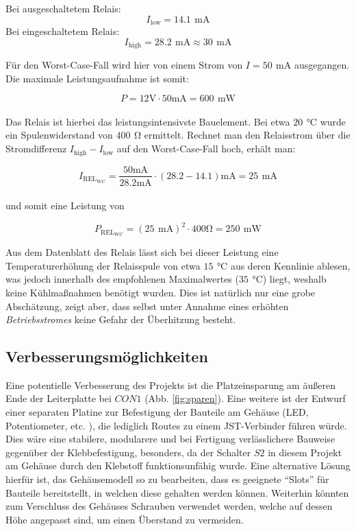 \documentclass[a4paper, 12pt]{article}
\begin{document}
      Bei ausgeschaltetem Relais: $$I_{\text{low}} = 14.1 \,\ \si{\milli\ampere}$$
      \indent Bei eingeschaltetem Relais: $$I_{\text{high}} = 28.2 \,\ \si{\milli\ampere} \approx 30 \,\ \si{\milli\ampere}$$


    Für den Worst-Case-Fall wird hier von einem Strom von $I = 50 \,\ \si{\milli\ampere}$ ausgegangen. Die maximale Leistungsaufnahme ist somit:

    $$P = 12 \si{\volt} \cdot 50 \si{\milli\ampere} = 600 \,\ \si{\milli\watt}$$\\

    Das Relais ist hierbei das leistungsintensivste Bauelement. Bei etwa $20 \,\ \si{\celsius}$ wurde ein Spulenwiderstand von $400 \,\ \si{\ohm}$ ermittelt. Rechnet man den Relaisstrom über die Stromdifferenz $I_{\text{high}}-I_{\text{low}}$ auf den Worst-Case-Fall hoch, erhält man:

    $$I_{\text{REL}_{\text{WC}}} = \frac{50\si{\milli\ampere}}{28.2\si{\milli\ampere}} \cdot (28.2 - 14.1)\si{\milli\ampere}= 25 \,\ \si{\milli\ampere}$$\\

    \noindent und somit eine Leistung von

    $$P_{\text{REL}_{\text{WC}}} = (25 \,\ \si{\milli\ampere})^2 \cdot 400 \si{\ohm} =  250 \,\ \si{\milli\watt}$$

    Aus dem Datenblatt des Relais lässt sich bei dieser Leistung eine Temperaturerhöhung der Relaisspule von etwa $15 \,\ \si{\celsius}$ aus deren Kennlinie ablesen, was jedoch innerhalb des empfohlenen Maximalwertes ($35 \,\ \si{\celsius}$) liegt, weshalb keine Kühlmaßnahmen benötigt wurden. Dies ist natürlich nur eine grobe Abschätzung, zeigt aber, dass selbst unter Annahme eines erhöhten \emph{Betriebsstromes} keine Gefahr der Überhitzung besteht.


  \subsection{Verbesserungsmöglichkeiten}
    Eine potentielle Verbesserung des Projekts ist die Platzeinsparung am äußeren Ende der Leiterplatte bei $CON1$ (Abb. \ref{fig:sparen}).
    Eine weitere ist der Entwurf einer separaten Platine zur Befestigung der Bauteile am Gehäuse (LED, Potentiometer, etc. ), die lediglich Routes zu einem JST-Verbinder führen würde. Dies wäre eine stabilere, modularere und bei Fertigung verlässlichere Bauweise gegenüber der Klebbefestigung, besonders, da der Schalter $S2$ in diesem Projekt am Gehäuse durch den Klebstoff funktionsunfähig wurde. Eine alternative Lösung hierfür ist, das Gehäusemodell so zu bearbeiten, dass es geeignete ``Slots'' für Bauteile bereitstellt, in welchen diese gehalten werden können. Weiterhin könnten zum Verschluss des Gehäuses Schrauben verwendet werden, welche auf dessen Höhe angepasst sind, um einen Überstand zu vermeiden.\\
\end{document}
